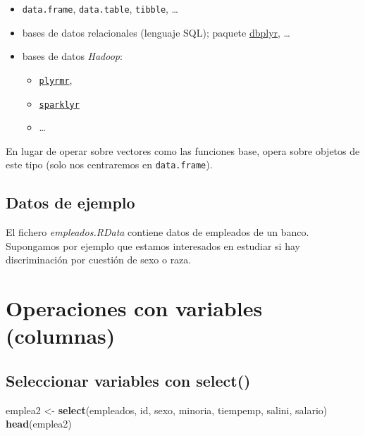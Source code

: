 \documentclass[]{book}
\newenvironment{Shaded}{\begin{snugshade}}{\end{snugshade}}
\newcommand{\KeywordTok}[1]{\textcolor[rgb]{0.13,0.29,0.53}{\textbf{#1}}}
\newcommand{\StringTok}[1]{\textcolor[rgb]{0.31,0.60,0.02}{#1}}
\newcommand{\NormalTok}[1]{#1}
\begin{document}
\begin{itemize}
\item
  \texttt{data.frame}, \texttt{data.table}, \texttt{tibble}, \ldots{}
\item
  bases de datos relacionales (lenguaje SQL); paquete
  \href{https://dbplyr.tidyverse.org}{dbplyr}, \ldots{}
\item
  bases de datos \emph{Hadoop}:

  \begin{itemize}
  \item
    \href{https://github.com/RevolutionAnalytics/plyrmr/blob/master/docs/tutorial.md}{\texttt{plyrmr}},
  \item
    \href{https://spark.rstudio.com}{\texttt{sparklyr}}
  \item
    \ldots{}
  \end{itemize}
\end{itemize}

En lugar de operar sobre vectores como las funciones base, opera sobre
objetos de este tipo (solo nos centraremos en \texttt{data.frame}).

\subsection{Datos de ejemplo}\label{datos-de-ejemplo}

El fichero \emph{empleados.RData} contiene datos de empleados de un
banco. Supongamos por ejemplo que estamos interesados en estudiar si hay
discriminación por cuestión de sexo o raza.

\section{Operaciones con variables
(columnas)}\label{operaciones-con-variables-columnas}

\subsection{\texorpdfstring{Seleccionar variables con
\textbf{select()}}{Seleccionar variables con select()}}\label{seleccionar-variables-con-select}

\begin{Shaded}
\begin{Highlighting}[]
\NormalTok{emplea2 <-}\StringTok{ }\KeywordTok{select}\NormalTok{(empleados, id, sexo, minoria, tiempemp, salini, salario)}
\KeywordTok{head}\NormalTok{(emplea2)}
\end{Highlighting}
\end{Shaded}
\end{document}
